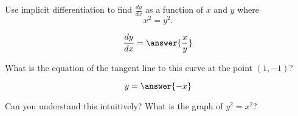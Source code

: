 \documentclass{ximera}
\author{Steven Gubkin}
\begin{document}
\begin{exercise}

Use implicit differentiation to find $\frac{dy}{dx}$ as a function of $x$ and $y$ where
\[
x^2 = y^2.
\]
\begin{prompt}
\[
\frac{dy}{dx} = \answer{\frac{x}{y}}
\]
\end{prompt}
What is the equation of the tangent line to this curve at the point $(1,-1)$?
\begin{prompt}
\[
y = \answer{-x}
\]
\end{prompt}
Can you understand this intuitively?  What is the graph of $y^2 = x^2$?
\end{exercise}
\end{document}
